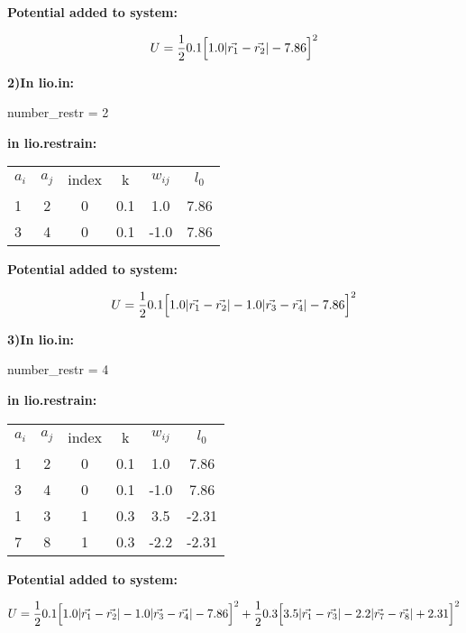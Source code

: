     \textbf{Potential added to system:}

    \begin{equation}
      U=\frac{1}{2} 0.1 \Big{[} 1.0 |\vec{r_1} - \vec{r_2}| - 7.86\Big{]}^2  
      \label{Ex1}
    \end{equation}


    \textbf{2)In lio.in:}

    number\_restr = 2

    \textbf{in lio.restrain:}

    \begin{table}  [H]
      \begin{center}
      \begin{tabular}{ l c c c c c}
         $a_i$ & $a_j$ & index &   k  &    $w_{ij}$   &  $l_0$    \\
         1  &  2 &   0   &  0.1 &    1.0   & 7.86   \\
         3  &  4 &   0   &  0.1 &   -1.0   & 7.86   \\
       \end{tabular}
       \end{center}
      \label{Tex2}
    \end{table}

    \textbf{Potential added to system:}

    \begin{equation}
      U=\frac{1}{2} 0.1 \Big{[} 1.0 |\vec{r_1} - \vec{r_2}| - 1.0 |\vec{r_3} - \vec{r_4}| - 7.86\Big{]}^2  
      \label{Ex2}
    \end{equation}


    \textbf{3)In lio.in:}

    number\_restr = 4

    \textbf{in lio.restrain:}

    \begin{table}  [H]
      \begin{center}
      \begin{tabular}{ l c c c c c}
         $a_i$ & $a_j$ & index &   k  &    $w_{ij}$   &  $l_0$    \\
         1  &  2 &   0   &  0.1 &    1.0   & 7.86   \\
         3  &  4 &   0   &  0.1 &   -1.0   & 7.86   \\
         1  &  3 &   1   &  0.3 &    3.5   & -2.31   \\
         7  &  8 &   1   &  0.3 &   -2.2   & -2.31   \\
       \end{tabular}
       \end{center}
      \label{Tex3}
    \end{table}

    \textbf{Potential added to system:}

    \begin{equation}
      U=\frac{1}{2} 0.1 \Big{[} 1.0 |\vec{r_1} - \vec{r_2}| - 1.0 |\vec{r_3} - \vec{r_4}| - 7.86\Big{]}^2 + \frac{1}{2} 0.3 \Big{[} 3.5 |\vec{r_1} - \vec{r_3}| - 2.2 |\vec{r_7} - \vec{r_8}| +2.31\Big{]}^2 
      \label{Ex3}
    \end{equation}

